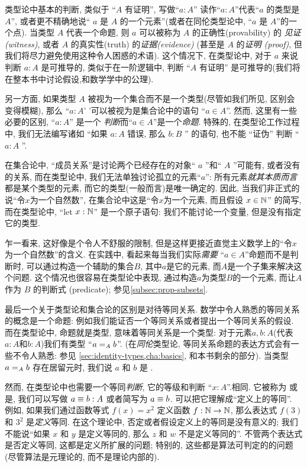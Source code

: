 类型论中基本的判断, 类似于 ``$A$ 有证明'', 写做``$a:A$''  读作``$a:A$''代表``$a$ 的类型是 $A$'', 或者更不精确地说`` $a$ 是 $A$ 的一个元素''(或者在同伦类型论中, ``$a$ 是 $A$''的一个点). %
%
%
当类型 $A$ 代表一个命题, 则 $a$ 可以被称为 $A$ 的正确性(provability) 的 \emph{见证(witness)}, 或者 $A$ 的真实性(truth) 的\emph{证据(evidence)} (甚至是 $A$ 的\emph{证明 (proof)}, 但我们将尽力避免使用这种令人困惑的术语). 这个情况下, 在类型论中, 对于 $a$ 来说判断 $a:A$ 是可推导的, 类似于在一阶逻辑中, 判断 ``$A$ 有证明'' 是可推导的(我们将在整本书中讨论假设,和数学学中的公理).

另一方面, 如果类型 $A$ 被视为一个集合而不是一个类型(尽管如我们所见, 区别会变得模糊),  那么 ``$a:A$' '可以被视为是集合论中的语句 ``$a\in A$''. 然而, 这里有一些必要的区别, ``$a:A$'' 是一个 \emph{判断}而``$a\in A$''是一个\emph{命题}. 特殊的, 在类型论工作过程中, 我们无法编写诸如 ``如果 $a:A$ 错误, 那么 $b:B$ '' 的语句, 也不能 ``证伪'' 判断 `` $a:A$ ''. 

在集合论中, ``成员关系''是讨论两个已经存在的对象`` $a$ ''和`` $A$ ''可能有, 或者没有的关系, 而在类型论中, 我们无法单独讨论孤立的元素``$a$'': 所有元素\emph{就其本质而言}都是某个类型的元素, 而它的类型(一般而言)是唯一确定的. 因此, 当我们非正式的说``令$x$为一个自然数'', 在集合论中这是``令$x$为一个元素, 而且假设 $x\in\nat$'' 的简写, 而在类型论中, ``let $x:\nat$'' 是一个原子语句: 我们不能讨论一个变量, 但是没有指定它的类型. 


乍一看来, 这好像是个令人不舒服的限制, 但是这样更接近直觉主义数学上的``令$x$为一个自然数''的含义. 在实践中, 看起来每当我们实际\emph{需要} ``$a\in A$''命题而不是判断时, 可以通过构造一个辅助的集合$B$, 其中$a$是它的元素, 而$A$是一个子集来解决这个问题. 这个情况也很容易在类型论中表现, 通过构造$a$为类型$B$的一个元素, 而让$A$作为 $B$ 的判断式 (predicate);  参见\cref{subsec:prop-subsets}. 

最后一个关于类型论和集合论的区别是对待等同关系. 数学中令人熟悉的等同关系的概念是一个命题: 例如我们能证否一个等同关系或者提出一个等同关系的假设. 而在类型论中, 命题就是类型, 意味着等同关系是一个类型: 对于元素$a,b:A$(代表$a:A$和$b:A$)我们有类型 ``$\id[A]ab$''. (在\emph{同伦}类型论, 等同关系命题的表达方式会有一些不令人熟悉: 参见 \cref{sec:identity-types,cha:basics}, 和本书剩余的部分). 当类型 $\id[A]ab$ 存在居留元时, 我们说 $a$ 和 $b$ 是 . %
%

然而, 在类型论中也需要一个等同\emph{判断}, 它的等级和判断 ``$x:A$''.相同. %
它被称为 %
%
或是, %
%
我们可以写做 $a\jdeq b : A$ 或者简写为 $a \jdeq b$. 可以把它理解成``定义上的等同''. 例如, 如果我们通过函数等式 $f(x)=x^2$ 定义函数 $f:\nat\to\nat$, 那么表达式 $f(3)$ 和 $3^2$ 是\emph{定义}等同. 在这个理论中, 否定或者假设定义上的等同是没有意义的; 我们不能说``如果 $x$ 和 $y$ 是定义等同的, 那么 $z$ 和 $w$ 不是定义等同的''. 不管两个表达式是否定义等同, 这都是定义所扩展的问题; 特别的, 这些都是算法可判定的的问题(尽管算法是元理论的, 而不是理论内部的). 

